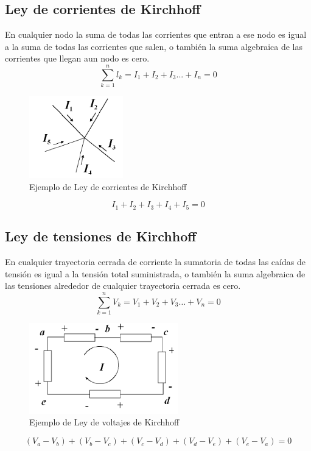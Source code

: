 \documentclass[twocolumn]{IEEEtran}
\begin{document}
\subsection{Ley de corrientes de Kirchhoff}
\noindent
En cualquier nodo la suma de todas las corrientes que entran a ese nodo es igual a la suma de todas las corrientes que salen, o también la suma algebraica de las corrientes que llegan  aun nodo es cero.
\begin{equation}
 \sum\limits_{k = 1}^n {{l_k} = {I_1} + {I_2} + {I_3}... + {I_n} = 0} 
\label{equ1}
\end{equation}
\begin{figure}[H]
	\centering
		\includegraphics[scale=0.7]{n1.png}
	\caption{Ejemplo de Ley de corrientes de Kirchhoff}
	\label{fig21}
\end{figure}
\noindent
\begin{equation}
 {I_1} + {I_2} + {I_3} + {I_4} + {I_5} = 0
\end{equation}

\subsection{Ley de tensiones de Kirchhoff}
\noindent
En cualquier trayectoria cerrada de corriente la sumatoria de todas las caídas de tensión  es igual a la tensión total suministrada, o también la suma algebraica de las tensiones alrededor de cualquier trayectoria cerrada es cero.
\begin{equation}
 \mathop \sum \limits_{k = 1}^n {V_k} = {V_1} + {V_2} + {V_3} \ldots  + {V_n} = 0
\end{equation}
\begin{figure}[H]
	\centering
		\includegraphics[scale=0.7]{v1.png}
	\caption{Ejemplo de Ley de voltajes de Kirchhoff}
	\label{fig22}
\end{figure}
\begin{equation}
 \left( {{V_a} - {V_b}} \right) + \left( {{V_b} - {V_c}} \right) + \left( {{V_c} - {V_d}} \right) + \left( {{V_d} - {V_e}} \right) + \left( {{V_e} - {V_a}} \right) = 0
\end{equation}
\end{document}
